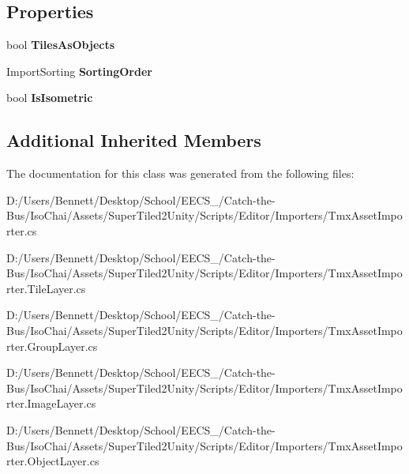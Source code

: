 \subsection*{Properties}
\begin{DoxyCompactItemize}
\item 
\mbox{\label{class_super_tiled2_unity_1_1_editor_1_1_tmx_asset_importer_a7a4f0a5c142fedfed9b1c543be345b07}} 
bool {\bfseries Tiles\+As\+Objects}
\item 
\mbox{\label{class_super_tiled2_unity_1_1_editor_1_1_tmx_asset_importer_a1e5c8cf74555df1c02fcacdd01621895}} 
Import\+Sorting {\bfseries Sorting\+Order}
\item 
\mbox{\label{class_super_tiled2_unity_1_1_editor_1_1_tmx_asset_importer_a447e59049dbf069e271ef7aa476c6883}} 
bool {\bfseries Is\+Isometric}
\end{DoxyCompactItemize}
\subsection*{Additional Inherited Members}


The documentation for this class was generated from the following files\+:\begin{DoxyCompactItemize}
\item 
D\+:/\+Users/\+Bennett/\+Desktop/\+School/\+E\+E\+C\+S\+\_/\+Catch-\/the-\/\+Bus/\+Iso\+Chai/\+Assets/\+Super\+Tiled2\+Unity/\+Scripts/\+Editor/\+Importers/Tmx\+Asset\+Importer.\+cs\item 
D\+:/\+Users/\+Bennett/\+Desktop/\+School/\+E\+E\+C\+S\+\_/\+Catch-\/the-\/\+Bus/\+Iso\+Chai/\+Assets/\+Super\+Tiled2\+Unity/\+Scripts/\+Editor/\+Importers/Tmx\+Asset\+Importer.\+Tile\+Layer.\+cs\item 
D\+:/\+Users/\+Bennett/\+Desktop/\+School/\+E\+E\+C\+S\+\_/\+Catch-\/the-\/\+Bus/\+Iso\+Chai/\+Assets/\+Super\+Tiled2\+Unity/\+Scripts/\+Editor/\+Importers/Tmx\+Asset\+Importer.\+Group\+Layer.\+cs\item 
D\+:/\+Users/\+Bennett/\+Desktop/\+School/\+E\+E\+C\+S\+\_/\+Catch-\/the-\/\+Bus/\+Iso\+Chai/\+Assets/\+Super\+Tiled2\+Unity/\+Scripts/\+Editor/\+Importers/Tmx\+Asset\+Importer.\+Image\+Layer.\+cs\item 
D\+:/\+Users/\+Bennett/\+Desktop/\+School/\+E\+E\+C\+S\+\_/\+Catch-\/the-\/\+Bus/\+Iso\+Chai/\+Assets/\+Super\+Tiled2\+Unity/\+Scripts/\+Editor/\+Importers/Tmx\+Asset\+Importer.\+Object\+Layer.\+cs\end{DoxyCompactItemize}
